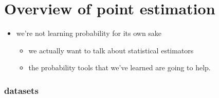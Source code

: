 

\part*{Overview of point estimation}%

\begin{itemize}
\item we're not learning probability for its own sake
\begin{itemize}
\item we actually want to talk about statistical estimators
\item the probability tools that we've learned are going to help.
\end{itemize}
\end{itemize}

\section{datasets}

